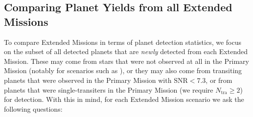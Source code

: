 \subsection{Comparing Planet Yields from all Extended Missions}
\label{sec:results_from_all_extended_missions}
To compare Extended Missions in terms of planet detection statistics, we focus on the subset of all detected planets that are \textit{newly} detected from each Extended Mission.
These may come from stars that were not observed at all in the Primary Mission (notably for scenarios such as \elong), or they may also come from transiting planets that were observed in the Primary Mission with $\mathrm{SNR}<7.3$, or from planets that were single-transiters in the Primary Mission (we require $N_\mathrm{tra}\geq2$) for detection.
With this in mind, for each Extended Mission scenario we ask the following questions:

